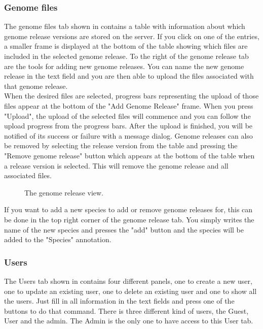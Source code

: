 \subsubsection{Genome files}


The genome files tab shown in  contains a table with information about which genome release versions are stored on the server. If you click on one of the entries, a smaller frame is displayed at the bottom of the table showing which files are included in the selected genome release. To the right of the genome release tab are the tools for adding new genome releases. You can name the new genome release in the text field and you are then able to upload the files associated with that genome release. \\

 When the desired files are selected, progress bars representing the upload of those files appear at the bottom of the "Add Genome Release" frame. When you press "Upload", the upload of the selected files will commence and you can follow the upload progress from the progress bars. After the upload is finished, you will be notified of its success or failure with a message dialog.
Genome releases can also be removed by selecting the release version from the table and pressing the "Remove genome release" button which appears at the bottom of the table when a release version is selected. This will remove the genome release and all associated files.

\begin{figure}[h!]
\caption{The genome release view.}
\label{fig:adm_desktopGenomeTab}
\end{figure}

If you want to add a new species to add or remove genome releases for, this can be done in the top right corner of the genome release tab. You simply writes the name of the new species and presses the "add" button and the species will be added to the "Species" annotation.


\subsubsection{Users}

The Users tab shown in  contains four different panels, one to create a new user, one to update an existing user, one to delete an existing user and one to show all the users. Just fill in all information in the text fields and press one of the buttons to do that command. There is three different kind of users, the Guest, User and the admin. The Admin is the only one to have access to this User tab.


